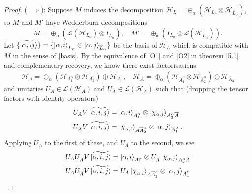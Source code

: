 \documentclass[12pt,a4paper]{report}
\numberwithin{equation}{section}
\newcommand{\ol}[1]{\overline{#1}}
\theoremstyle{definition}
\theoremstyle{theorem}
\theoremstyle{theorem}
\theoremstyle{example}
\theoremstyle{definition}
\begin{document}
\begin{proof}
	($\implies$): Suppose $M$ induces the decomposition $\mathcal{H}_{L}=\oplus_{\alpha}(\mathcal{H}_{L_{\alpha}}\otimes\mathcal{H}_{\ol{L}_{\alpha}})$, so $M$ and $M'$ have Wedderburn decompositions
	\begin{equation}
		M=\oplus_{\alpha}(\mathcal{L}(\mathcal{H}_{L_{\alpha}})\otimes I_{\ol{L}_{\alpha}}),\quad M'=\oplus_{\alpha}(I_{L_{\alpha}}\otimes\mathcal{L}(\mathcal{H}_{\ol{L}_{\alpha}})).
	\end{equation}
	Let $\{\ket{\widetilde{\alpha,ij}}\}=\{\ket{{\alpha,i}}_{L_{\alpha}}\otimes\ket{{\alpha,j}}_{\ol{L}_{\alpha}}\}$ be the basis of $\mathcal{H}_{L}$ which is compatible with $M$ in the sense of \ref{basis}. By the equivalence of \ref{O1} and \ref{O2} in theorem \ref{5.1} and complementary recovery, we know there exist factorisations
	\begin{equation}
		\mathcal{H}_{A}=\oplus_{\alpha}(\mathcal{H}_{A_{1}^{\alpha}}\otimes\mathcal{H}_{A_{2}^{\alpha}})\oplus\mathcal{H}_{A_{3}},\quad\mathcal{H}_{\ol{A}}=\oplus_{\alpha}(\mathcal{H}_{\ol{A}_{1}^{\alpha}}\otimes\mathcal{H}_{\ol{A}_{2}^{\alpha}})\oplus\mathcal{H}_{\ol{A}_{3}}
	\end{equation}
	and unitaries $U_{A}\in\mathcal{L}(\mathcal{H}_{A})$ and $U_{\ol{A}}\in\mathcal{L}(\mathcal{H}_{\ol{A}})$ such that (dropping the tensor factors with identity operators)
	\begin{equation}
		\begin{aligned}
			U_{A}V\ket{\widetilde{\alpha,i,j}}&=\ket{\alpha,i}_{A_{1}^{\alpha}}\otimes\ket{\chi_{\alpha,j}}_{A_{2}^{\alpha}\ol{A}}\\
			U_{\ol{A}}V\ket{\widetilde{\alpha,i,j}}&=\ket{\ol{\chi}_{\alpha,i}}_{A\ol{A}_{2}^{\alpha}}\otimes\ket{\alpha,j}_{\ol{A}_{1}^{\alpha}}.
		\end{aligned}
	\end{equation}
	Applying $U_{\ol{A}}$ to the first of these, and $U_{A}$ to the second, we see
	\begin{equation}\label{333}
		\begin{aligned}
			U_{A}U_{\ol{A}}V\ket{\widetilde{\alpha,i,j}}&=\ket{\alpha,i}_{A_{1}^{\alpha}}\otimes U_{\ol{A}}\ket{\chi_{\alpha,j}}_{A_{2}^{\alpha}\ol{A}}\\
			U_{A}U_{\ol{A}}V\ket{\widetilde{\alpha,i,j}}&=U_{A}\ket{\ol{\chi}_{\alpha,i}}_{A\ol{A}_{2}^{\alpha}}\otimes\ket{\alpha,j}_{\ol{A}_{1}^{\alpha}}
		\end{aligned}
	\end{equation}

\end{proof}
\end{document}
